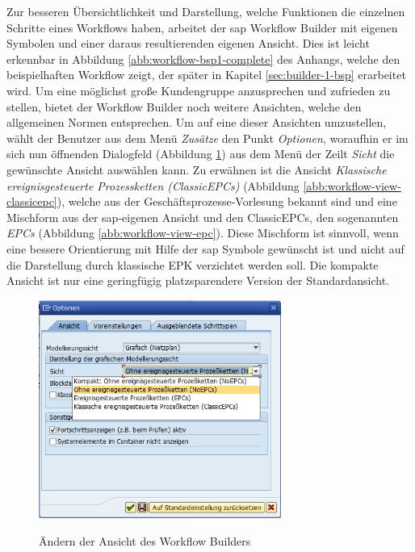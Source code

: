 Zur besseren Übersichtlichkeit und Darstellung, welche Funktionen die einzelnen Schritte eines Workflows haben, arbeitet der \gls{sap} Workflow Builder mit eigenen Symbolen und einer daraus resultierenden eigenen Ansicht. Dies ist leicht erkennbar in Abbildung \ref{abb:workflow-bsp1-complete} des Anhangs, welche den beispielhaften Workflow zeigt, der später in Kapitel \ref{sec:builder-1-bsp} erarbeitet wird. Um eine möglichst große Kundengruppe anzusprechen und zufrieden zu stellen, bietet der Workflow Builder noch weitere Ansichten, welche den allgemeinen Normen entsprechen. Um auf eine dieser Ansichten umzustellen, wählt der Benutzer aus dem Menü \textit{Zusätze} den Punkt \textit{Optionen}, woraufhin er im sich nun öffnenden Dialogfeld (Abbildung \ref{abb:workflow-change-view}) aus dem Menü der Zeilt \textit{Sicht} die gewünschte Ansicht auswählen kann. Zu erwähnen ist die Ansicht \textit{Klassische ereignisgesteuerte Prozessketten (ClassicEPCs)} (Abbildung \ref{abb:workflow-view-classicepc}), welche aus der Geschäftsprozesse-Vorlesung bekannt sind und eine Mischform aus der \gls{sap}-eigenen Ansicht und den ClassicEPCs, den sogenannten \textit{EPCs} (Abbildung \ref{abb:workflow-view-epc}). Diese Mischform ist sinnvoll, wenn eine bessere Orientierung mit Hilfe der \gls{sap} Symbole gewünscht ist und nicht auf die Darstellung durch klassische EPK verzichtet werden soll. Die kompakte Ansicht ist nur eine geringfügig platzsparendere Version der Standardansicht.

\begin{figure}[h]
	\begin{center}
	\includegraphics[width=300px]{grafiken/wf-builder_options-change-view.png}
	\caption{Ändern der Ansicht des Workflow Builders}
	\vspace{-10pt}
	\label{abb:workflow-change-view}
	\end{center}
\end{figure}

